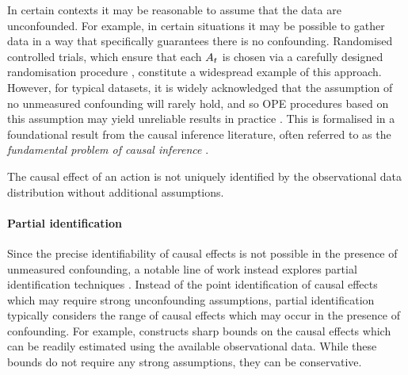 In certain contexts it may be reasonable to assume that the data are unconfounded. For example, in certain situations it may be possible to gather data in a way that specifically guarantees there is no confounding.
Randomised controlled trials, which ensure that each $A_t$ is chosen via a carefully designed randomisation procedure \citep{lavori2004dynamic,murphy2005experimental}, constitute a widespread example of this approach. However, for typical datasets, it is widely acknowledged that the assumption of no unmeasured confounding will rarely hold, and so OPE procedures based on this assumption may yield unreliable results in practice \citep{murphy2003optimal,tsiatis2019dynamic}. 
This is formalised in a foundational result from the causal inference literature, often referred to as the \emph{fundamental problem of causal inference} \citep{holland1986statistics}.
\begin{mainresultwithtitle}[title=Fundamental problem of causal inference (informal statement)]\noindent
    The causal effect of an action is not uniquely identified by the observational data distribution without additional assumptions.
\end{mainresultwithtitle}


\paragraph{Partial identification}
Since the precise identifiability of causal effects is not possible in the presence of unmeasured confounding, a notable line of work instead explores partial identification techniques \citep{manski,manski1989anatomy, manski2003partial}. Instead of the point identification of causal effects which may require strong unconfounding assumptions, partial identification typically considers the range of causal effects which may occur in the presence of confounding. For example, \cite{manski} constructs sharp bounds on the causal effects which can be readily estimated using the available observational data. While these bounds do not require any strong assumptions, they can be conservative. 


